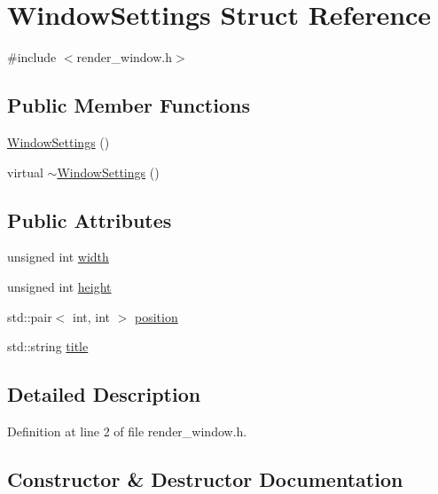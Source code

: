 \hypertarget{struct_window_settings}{}\section{Window\+Settings Struct Reference}
\label{struct_window_settings}


{\ttfamily \#include $<$render\+\_\+window.\+h$>$}

\subsection*{Public Member Functions}
\begin{DoxyCompactItemize}
\item 
\hyperlink{struct_window_settings_a0e207ef630ccd1400f7066920b156fdf}{Window\+Settings} ()
\item 
virtual \hyperlink{struct_window_settings_a4d46e054b8672014b852f2d81ba272d3}{$\sim$\+Window\+Settings} ()
\end{DoxyCompactItemize}
\subsection*{Public Attributes}
\begin{DoxyCompactItemize}
\item 
unsigned int \hyperlink{struct_window_settings_a682fe02f872545c310d3d0dbf26720c7}{width}
\item 
unsigned int \hyperlink{struct_window_settings_a87cdc37b29add484995e2c54bcdb389b}{height}
\item 
std\+::pair$<$ int, int $>$ \hyperlink{struct_window_settings_a041200534ceac3296a8eb4b0dd1bbe30}{position}
\item 
std\+::string \hyperlink{struct_window_settings_a5f56c222507f096ac106b06235ac53e8}{title}
\end{DoxyCompactItemize}


\subsection{Detailed Description}


Definition at line 2 of file render\+\_\+window.\+h.



\subsection{Constructor \& Destructor Documentation}
\hypertarget{struct_window_settings_a0e207ef630ccd1400f7066920b156fdf}{}
